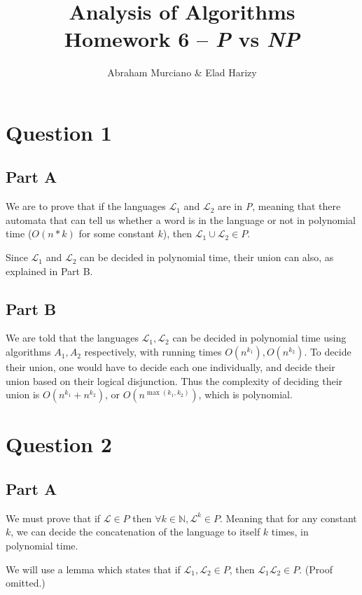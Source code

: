 \documentclass{article}
\title{Analysis of Algorithms \\
\medskip
\large Homework 6 -- \textit{P} vs \textit{NP}}
\author{Abraham Murciano \& Elad Harizy}
\newcommand{\lang}{\mathcal{L}}
\begin{document}
\maketitle

\section*{Question 1}

\subsection*{Part A}

We are to prove that if the languages \(\lang_1\) and \(\lang_2\) are in \textit{P}, meaning that there automata that can tell us whether a word is in the language or not in polynomial time (\(O(n*k)\) for some constant \(k\)), then \(\lang_1 \cup \lang_2 \in P\).

Since \(\lang_1\) and \(\lang_2\) can be decided in polynomial time, their union can also, as explained in Part B.

\subsection*{Part B}

We are told that the languages \(\lang_1, \lang_2\) can be decided in polynomial time using algorithms \(A_1, A_2\) respectively, with running times \(O(n^{k_1}), O(n^{k_2})\). To decide their union, one would have to decide each one individually, and decide their union based on their logical disjunction. Thus the complexity of deciding their union is \(O(n^{k_1} + n^{k_2})\), or \(O(n^{\max(k_1, k_2)})\), which is polynomial.

\section*{Question 2}

\subsection*{Part A}

We must prove that if \(\lang \in P\) then \(\forall k \in \mathbb{N}, \lang^k \in P\). Meaning that for any constant \(k\), we can decide the concatenation of the language to itself \(k\) times, in polynomial time.

We will use a lemma which states that if \(\lang_1, \lang_2 \in P\), then \(\lang_1\lang_2 \in P\). (Proof omitted.)
\end{document}
